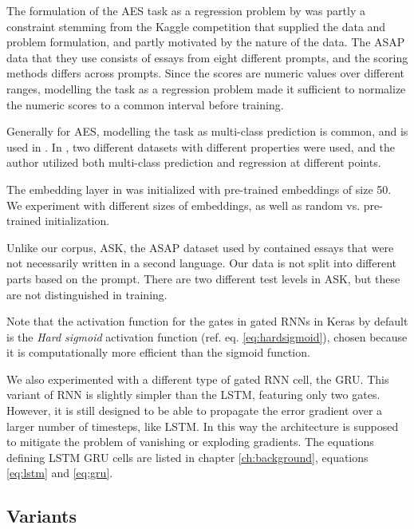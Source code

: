 The formulation of the \ac{AES} task as a regression problem by
\citeauthor{taghipour16} was partly a constraint stemming from the Kaggle
competition that supplied the data and problem formulation, and partly
motivated by the nature of the data. The ASAP data that they use consists of
essays from eight different prompts, and the scoring methods differs across
prompts. Since the scores are numeric values over different ranges, modelling
the task as a regression problem made it sufficient to normalize the numeric
scores to a common interval before training.

Generally for \ac{AES}, modelling the task as multi-class prediction is
common, and is used in \textcite{vajjala18universalCEFR}. In
\textcite{vajjala17}, two different datasets with different properties were
used, and the author utilized both multi-class prediction and regression at
different points.

The embedding layer in \textcite{taghipour16} was initialized with
pre-trained embeddings of size 50. We experiment with different sizes of
embeddings, as well as random vs. pre-trained initialization.

Unlike our corpus, ASK, the ASAP dataset used by \citeauthor{taghipour16}
contained essays that were not necessarily written in a second language. Our
data is not split into different parts based on the prompt. There are two
different test levels in ASK, but these are not distinguished in training.

Note that the activation function for the gates in gated RNNs in Keras by
default is the \emph{Hard sigmoid} activation function (ref. eq.
\ref{eq:hardsigmoid}), chosen because it is computationally more efficient
than the sigmoid function.

We also experimented with a different type of gated \ac{RNN} cell, the
\ac{GRU}. This variant of \ac{RNN} is slightly simpler than the \ac{LSTM},
featuring only two gates. However, it is still designed to be able to
propagate the error gradient over a larger number of timesteps, like
\ac{LSTM}. In this way the architecture is supposed to mitigate the problem
of vanishing or exploding gradients. The equations defining \ac{LSTM}
\ac{GRU} cells are listed in chapter \ref{ch:background}, equations
\ref{eq:lstm} and \ref{eq:gru}.


\subsection{Variants}


